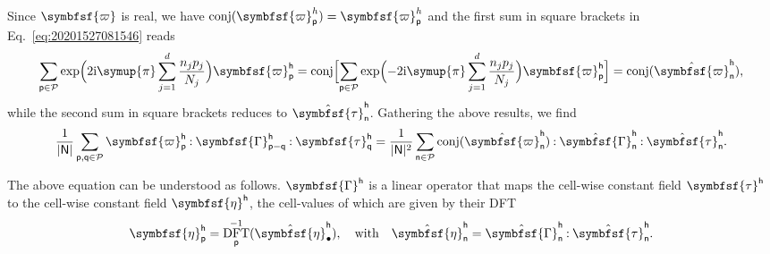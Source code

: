 \documentclass[draft, appendixprefix=true, chapterprefix=true, fontsize=12pt, numbers=noendperiod]{scrbook}
\newcommand{\cellindices}{\mathcal P}
\DeclareMathOperator{\conj}{conj}
\newcommand{\dbldot}{\mathbin{\mathord{:}}}
\DeclareMathOperator{\dft}{DFT}
\newcommand{\I}{\mathrm{i}}
\newcommand{\tens}[1]{\symbfsf{#1}}
\newcommand{\PI}{\symup{\pi}}
\newcommand{\tuple}[1]{\mathsf{#1}}
\begin{document}
Since \(\tens\varpi\) is real, we have
\(\conj(\tens\varpi_{\tuple p}^h)=\tens\varpi_{\tuple p}^h\) and the first sum in
square brackets in Eq.~\eqref{eq:20201527081546} reads
\begin{equation}
  \sum_{\tuple{p}\in\cellindices}\exp\Bigl(2\I\PI\sum_{j=1}^d\frac{n_jp_j}{N_j}\Bigr)
  \tens\varpi_{\tuple p}^{\tuple h}=\conj\Bigl[\sum_{\tuple{p}\in\cellindices}
  \exp\Bigl(-2\I\PI\sum_{j=1}^d\frac{n_jp_j}{N_j}\Bigr)
  \tens\varpi_{\tuple p}^{\tuple h}\Bigr]
  =\conj(\hat{\tens\varpi}_{\tuple n}^{\tuple h}),
\end{equation}
while the second sum in square brackets reduces to
\(\hat{\tens\tau}_{\tuple n}^{\tuple h}\). Gathering the above results, we find
\begin{equation}
  \frac{1}{\lvert\tuple N\rvert}\sum_{\tuple p, \tuple q\in\cellindices}
  \tens\varpi_{\tuple p}^{\tuple h}\dbldot\tens\Gamma_{\tuple p-\tuple q}^{\tuple h}
  \dbldot\tens\tau_{\tuple q}^{\tuple h}=\frac1{\lvert\tuple N\rvert^2}
  \sum_{\tuple n\in\cellindices}\conj(\hat{\tens\varpi}_{\tuple n}^{\tuple h})
  \dbldot\hat{\tens\Gamma}_{\tuple n}^{\tuple h}\dbldot
  \hat{\tens\tau}_{\tuple n}^{\tuple h}.
\end{equation}

The above equation can be understood as follows. \(\tens\Gamma^{\tuple h}\) is
a linear operator that maps the cell-wise constant field
\(\tens\tau^{\tuple h}\) to the cell-wise constant field
\(\tens\eta^{\tuple h}\), the cell-values of which are given by their DFT
\begin{equation}
  \tens{\eta}_{\tuple p}^{\tuple h}=
  \dft^{-1}_{\tuple p}(\hat{\tens\eta}_{\bullet}^{\tuple h}),\quad\text{with}
  \quad\hat{\tens\eta}_{\tuple n}^{\tuple h}
  =\hat{\tens\Gamma}_{\tuple n}^{\tuple h}\dbldot
  \hat{\tens\tau}_{\tuple n}^{\tuple h}.
\end{equation}
\end{document}

